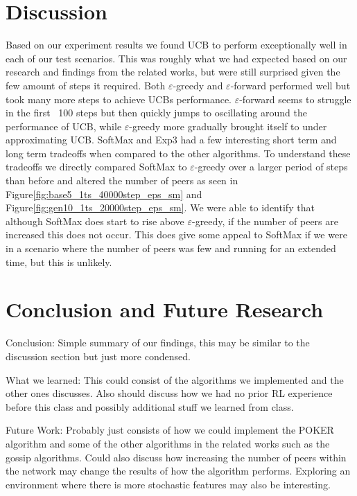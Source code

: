 \documentclass{article}
\begin{document}
\section{Discussion}

Based on our experiment results we found UCB to perform exceptionally well in each of our test scenarios. This was roughly what we had expected based on our research and 
findings from the related works, but were still surprised given the few amount of steps it required. Both $\varepsilon$-greedy and $\varepsilon$-forward performed well
but took many more steps to achieve UCBs performance. $\varepsilon$-forward seems to struggle in the first ~100 steps but then quickly jumps to oscillating around
the performance of UCB, while $\varepsilon$-greedy more gradually brought itself to under approximating UCB. SoftMax and Exp3 had a few interesting short term and long term
tradeoffs when compared to the other algorithms. To understand these tradeoffs we directly compared SoftMax to $\varepsilon$-greedy over a larger period of steps than before 
and altered the number of peers as seen in Figure\ref{fig:base5_1ts_40000step_eps_sm} and Figure\ref{fig:gen10_1ts_20000step_eps_sm}. We were able to identify that although 
SoftMax does start to rise above $\varepsilon$-greedy, if the number of peers are increased this does not occur. This does give some appeal to SoftMax if we were in a 
scenario where the number of peers was few and running for an extended time, but this is unlikely. 


\section{Conclusion and Future Research}

Conclusion: Simple summary of our findings, this may be similar to the discussion section but just more condensed.

What we learned: This could consist of the algorithms we implemented and the other ones discusses. Also should discuss how we had no prior RL experience
before this class and possibly additional stuff we learned from class.

Future Work: Probably just consists of how we could implement the POKER algorithm and some of the other algorithms in the related works such as the gossip algorithms. Could
also discuss how increasing the number of peers within the network may change the results of how the algorithm performs. Exploring an environment where there is more stochastic 
features may also be interesting.



\end{document}
